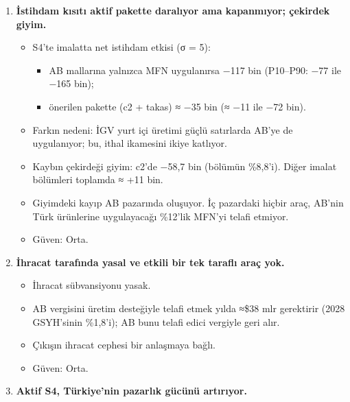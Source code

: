 \begin{enumerate}
\begin{itemize}
    \begin{itemize}
    \tightlist
    \item
      İGV yalnızca yurt içi üretimi zayıf satırlarda kaldırılır;
    \item
      üretilmeyen girdilerde tarife sıfırlanır;
    \item
      imalat ürünlerinde menşeden bağımsız ÖTV/KDV takası yapılır.
    \end{itemize}
  \item
    Sonuç: TÜFE 3,3 bp (2,5--4,1). Tahsil edilebilir net mali etki GSYH'nin +\%0,05'i. Çin ve diğer kaynaklara karşı mevcut koruma korunuyor.
  \item
    \etiketT{} Güven: Orta.
  \end{itemize}
\item
  \textbf{İstihdam kısıtı aktif pakette daralıyor ama kapanmıyor; çekirdek giyim.}

  \begin{itemize}
  \tightlist
  \item
    S4'te imalatta net istihdam etkisi (σ = 5):

    \begin{itemize}
    \tightlist
    \item
      AB mallarına yalnızca MFN uygulanırsa −117 bin (P10--P90: −77 ile −165 bin);
    \item
      önerilen pakette (c2 + takas) ≈ −35 bin (≈ −11 ile −72 bin).
    \end{itemize}
  \item
    Farkın nedeni: İGV yurt içi üretimi güçlü satırlarda AB'ye de uygulanıyor; bu, ithal ikamesini ikiye katlıyor.
  \item
    Kaybın çekirdeği giyim: c2'de −58,7 bin (bölümün \%8,8'i). Diğer imalat bölümleri toplamda ≈ +11 bin.
  \item
    Giyimdeki kayıp AB pazarında oluşuyor. İç pazardaki hiçbir araç, AB'nin Türk ürünlerine uygulayacağı \%12'lik MFN'yi telafi etmiyor.
  \item
    \etiketT{} Güven: Orta.
  \end{itemize}
\item
  \textbf{İhracat tarafında yasal ve etkili bir tek taraflı araç yok.}

  \begin{itemize}
  \tightlist
  \item
    İhracat sübvansiyonu yasak.
  \item
    AB vergisini üretim desteğiyle telafi etmek yılda ≈\$38 mlr gerektirir (2028 GSYH'sinin \%1,8'i); AB bunu telafi edici vergiyle geri alır.
  \item
    Çıkışın ihracat cephesi bir anlaşmaya bağlı.
  \item
    \etiketT{} Güven: Orta.
  \end{itemize}
\item
  \textbf{Aktif S4, Türkiye'nin pazarlık gücünü artırıyor.}


\end{enumerate}

